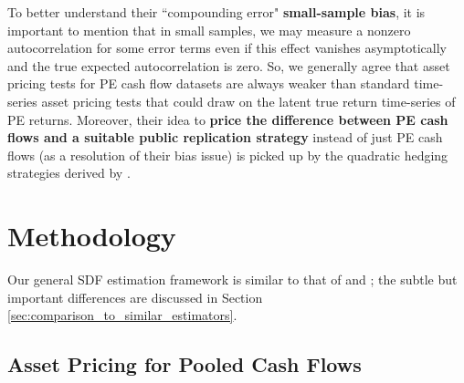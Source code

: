 \documentclass[12pt]{article}
\begin{document}
To better understand their ``compounding error" \textbf{small-sample bias}, it is important to mention that in small samples, we may measure a nonzero autocorrelation for some error terms even if this effect vanishes asymptotically and the true expected autocorrelation is zero.
So, we generally agree that asset pricing tests for PE cash flow datasets are always weaker than standard time-series asset pricing tests that could draw on the latent true return time-series of PE returns.
Moreover, their idea to \textbf{price the difference between PE cash flows and a suitable public replication strategy} instead of just PE cash flows (as a resolution of their bias issue) is picked up by the quadratic hedging strategies derived by \cite{T19}.


\section{Methodology}
\label{sec:spatial_sdf_methodology}

Our general SDF estimation framework is similar to that of \cite{DLP12} and \cite{KN16}; 
the subtle but important differences are discussed in Section \ref{sec:comparison_to_similar_estimators}.


\subsection{Asset Pricing for Pooled Cash Flows}
\label{sec:asset_pricing_pooled}
\end{document}
